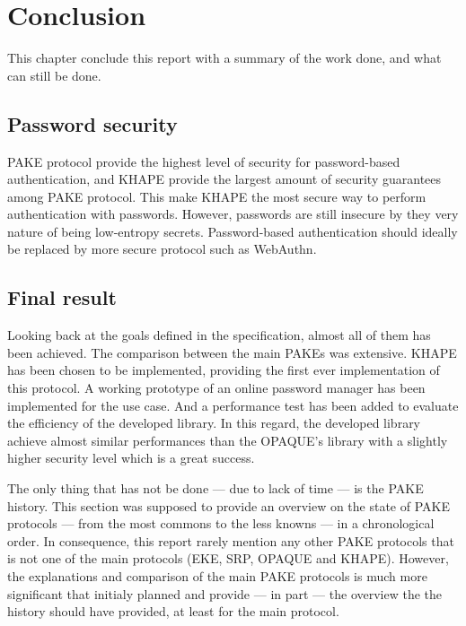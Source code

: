\documentclass[../report.tex]{subfiles}
\begin{document}
\chapter{Conclusion}

This chapter conclude this report with a summary of the work done, and what can still be done.

\section{Password security}
PAKE protocol provide the highest level of security for password-based authentication, and KHAPE provide the largest amount of security guarantees among PAKE protocol. This make KHAPE the most secure way to perform authentication with passwords.
However, passwords are still insecure by they very nature of being low-entropy secrets. Password-based authentication should ideally be replaced by more secure protocol such as WebAuthn.


\section{Final result}
Looking back at the goals defined in the specification, almost all of them has been achieved.
The comparison between the main PAKEs was extensive.
KHAPE has been chosen to be implemented, providing the first ever implementation of this protocol. %
A working prototype of an online password manager has been implemented for the use case.
And a performance test has been added to evaluate the efficiency of the developed library. In this regard, the developed library achieve almost similar performances than the OPAQUE's library with a slightly higher security level which is a great success.

The only thing that has not be done --- due to lack of time --- is the PAKE history. This section was supposed to provide an overview on the state of PAKE protocols --- from the most commons to the less knowns --- in a chronological order. In consequence, this report rarely mention any other PAKE protocols that is not one of the main protocols (EKE, SRP, OPAQUE and KHAPE). However, the explanations and comparison of the main PAKE protocols is much more significant that initialy planned and provide --- in part --- the overview the the history should have provided, at least for the main protocol.
\end{document}
